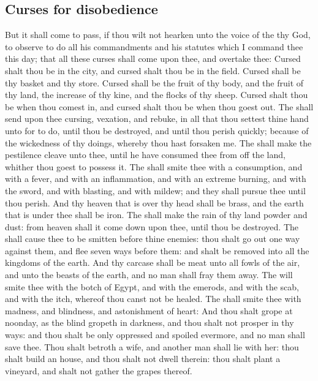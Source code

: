 \begin{biblechapter}
\section*{Curses for disobedience}
\verse But it shall come to pass, if thou wilt not hearken unto the voice of the \LORD thy God, to observe to do all his commandments and his statutes which I command thee this day; that all these curses shall come upon thee, and overtake thee:
\verse Cursed shalt thou be in the city, and cursed shalt thou be in the field.
\verse Cursed shall be thy basket and thy store.
\verse Cursed shall be the fruit of thy body, and the fruit of thy land, the increase of thy kine, and the flocks of thy sheep.
\verse Cursed shalt thou be when thou comest in, and cursed shalt thou be when thou goest out.
\verse The \LORD shall send upon thee cursing, vexation, and rebuke, in all that thou settest thine hand unto for to do, until thou be destroyed, and until thou perish quickly; because of the wickedness of thy doings, whereby thou hast forsaken me.
\verse The \LORD shall make the pestilence cleave unto thee, until he have consumed thee from off the land, whither thou goest to possess it.
\verse The \LORD shall smite thee with a consumption, and with a fever, and with an inflammation, and with an extreme burning, and with the sword, and with blasting, and with mildew; and they shall pursue thee until thou perish.
\verse And thy heaven that is over thy head shall be brass, and the earth that is under thee shall be iron.
\verse The \LORD shall make the rain of thy land powder and dust: from heaven shall it come down upon thee, until thou be destroyed.
\verse The \LORD shall cause thee to be smitten before thine enemies: thou shalt go out one way against them, and flee seven ways before them: and shalt be removed into all the kingdoms of the earth.
\verse And thy carcase shall be meat unto all fowls of the air, and unto the beasts of the earth, and no man shall fray them away.
\verse The \LORD will smite thee with the botch of Egypt, and with the emerods, and with the scab, and with the itch, whereof thou canst not be healed.
\verse The \LORD shall smite thee with madness, and blindness, and astonishment of heart:
\verse And thou shalt grope at noonday, as the blind gropeth in darkness, and thou shalt not prosper in thy ways: and thou shalt be only oppressed and spoiled evermore, and no man shall save thee.
\verse Thou shalt betroth a wife, and another man shall lie with her: thou shalt build an house, and thou shalt not dwell therein: thou shalt plant a vineyard, and shalt not gather the grapes thereof.

\end{biblechapter}
